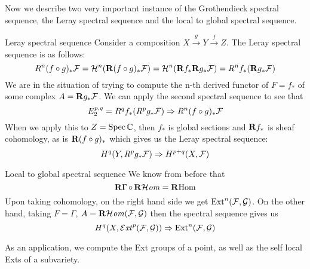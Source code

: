 Now we describe two very important instance of the Grothendieck spectral sequence, the Leray spectral sequence and the local to global spectral sequence.

\begin{example}{Leray spectral sequence}{} Consider a composition $X\xrightarrow{g}Y\xrightarrow{f}Z$. The Leray spectral sequence is as follows:
\begin{equation*}
    R^n(f\circ g)_*\mathcal{F}
        = \mathcal{H}^n(\mathbf{R}(f\circ g)_*\mathcal{F})
        = \mathcal{H}^n(\mathbf{R} f_*\mathbf{R} g_*\mathcal{F})
        = R^nf_*(\mathbf{R} g_*\mathcal{F})
\end{equation*}
We are in the situation of trying to compute the n-th derived functor of $F=f_*$ of some complex $A=\mathbf{R} g_*\mathcal{F}$. We can apply the second spectral sequence to see that
\begin{equation*}
    E_2^{p,q}
        = R^qf_*(R^pg_*\mathcal{F})
        \Rightarrow R^n(f\circ g)_*\mathcal{F}
\end{equation*}
When we apply this to $Z=\operatorname{Spec}\mathbb{C}$, then $f_*$ is global sections and $\mathbf{R} f_*$ is sheaf cohomology, as is $\mathbf{R}(f\circ g)_*$ which gives us the Leray spectral sequence:
\begin{equation*}
    H^q(Y,R^pg_*\mathcal{F}) \Rightarrow H^{p+q}(X,\mathcal{F})
\end{equation*}
\end{example}

\begin{example}{Local to global spectral sequence}{}
We know from before that
\begin{equation*}
    \operatorname{\mathbf{R}\Gamma}\circ\operatorname{\mathbf{R}\mathcal{H}\mathit{om}} = \operatorname{\mathbf{R} Hom}
\end{equation*}
Upon taking cohomology, on the right hand side we get $\operatorname{Ext}^n(\mathcal{F},\mathcal{G})$. On the other hand, taking $F=\Gamma$, $A=\operatorname{\mathbf{R}\mathcal{H}\mathit{om}}(\mathcal{F},\mathcal{G})$ then the spectral sequence gives us
\begin{equation*}
    H^q(X,\operatorname{\mathcal{E}\mathit{xt}}^p(\mathcal{F},\mathcal{G})) \Rightarrow \operatorname{Ext}^n(\mathcal{F},\mathcal{G})
\end{equation*}
\end{example}

As an application, we compute the Ext groups of a point, as well as the self local Exts of a subvariety.

